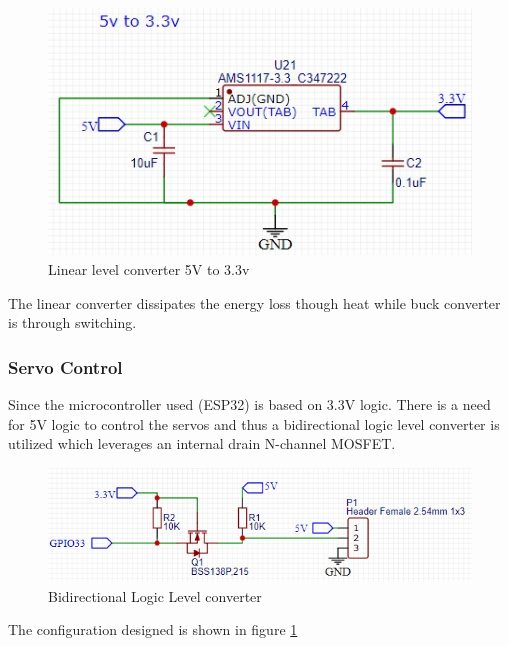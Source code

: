 \begin{center}
	\begin{figure}[H]
	\centering
	\includegraphics{Figures/5233}
	\caption[Linear Voltage Converter]{Linear level converter 5V to 3.3v}
	\end{figure}
\end{center}
The linear converter dissipates the energy loss though heat while buck converter is through switching.

\subsubsection{Servo Control}
Since the microcontroller used (ESP32) is based on 3.3V logic. There is a need for 5V logic to control the servos and thus a bidirectional logic level converter is utilized which leverages an internal drain N-channel MOSFET. 
\begin{center}
	\begin{figure}[H]
	\centering
	\includegraphics{Figures/logik}
	\caption[Bidirectional Logic Level converter]{Bidirectional Logic Level converter}
	\label{fig:logik}
	\end{figure}
\end{center}
The configuration designed is shown in figure \ref{fig:logik}